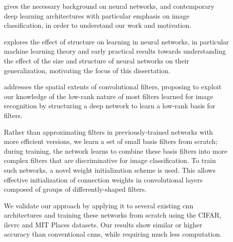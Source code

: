 \documentclass[thesis]{subfiles}
\begin{document}
\begin{description}
	\item[] gives the necessary background on neural networks, and contemporary deep learning architectures
	with particular emphasis on image classification, in order to understand our work and motivation.
	
	\item[] explores the effect of structure on learning in neural networks, in particular machine learning theory and early practical results towards understanding the effect of the size and structure of neural networks on their generalization, motivating the focus of this dissertation.
	
	\item[] addresses the spatial extents of convolutional filters, proposing to exploit our knowledge of the low-rank nature of most filters learned for image recognition by structuring a deep network to learn a low-rank basis for filters.
	
	Rather than approximating filters in previously-trained networks with more efficient versions, we learn a set of small basis filters from scratch; during training, the network learns to combine these basis filters into more complex filters that are discriminative for image classification. To train such networks, a novel weight initialization scheme is used. This allows effective initialization of connection weights in convolutional layers composed of groups of differently-shaped filters. 
	
	We validate our approach by applying it to several existing \gls{cnn} architectures and training these networks from scratch using the CIFAR, \gls{ilsvrc} and MIT Places datasets. Our results show similar or higher accuracy than conventional \glspl{cnn}, while requiring much less computation. %
	

\end{description}
\end{document}
